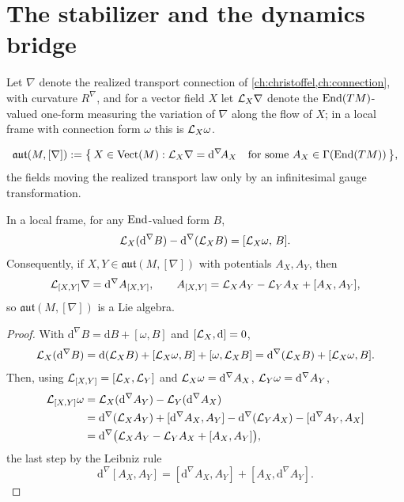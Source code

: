 \section{The stabilizer and the dynamics bridge}
\label{sec:dyn-bridge}
Let \(\nabla\) denote the realized transport connection of
\cref{ch:christoffel,ch:connection}, with curvature \(R^\nabla\), and
for a vector field \(X\) let \(\mathcal L_X\nabla\) denote the
\(\mathrm{End}(TM)\)-valued one-form measuring the variation of \(\nabla\)
along the flow of \(X\); in a local frame with connection form
\(\omega\) this is \(\mathcal L_X\omega\).

\begin{definition}
	\label{def:dyn-symmetry-algebra}
	\[
		\mathfrak{aut}(M,[\nabla])
		:=
		\bigl\{\,X\in\mathrm{Vect}(M)
		:
		\mathcal L_X\nabla=\mathrm d^{\nabla}\!A_X
		\quad\text{for some } A_X\in\Gamma(\mathrm{End}(TM))\,\bigr\},
	\]
	the fields moving the realized transport law only by an
	infinitesimal gauge transformation.
\end{definition}

\begin{lemma}
	\label{lem:dyn-gauge-cocycle}
	In a local frame, for any \(\mathrm{End}\)-valued form \(B\),
	\[
		\mathcal L_X(\mathrm d^\nabla B)-\mathrm d^\nabla(\mathcal L_XB)
		=
		[\mathcal L_X\omega,\,B] .
	\]
	Consequently, if \(X,Y\in\mathfrak{aut}(M,[\nabla])\) with
	potentials \(A_X,A_Y\), then
	\[
		\mathcal L_{[X,Y]}\nabla
		=
		\mathrm d^\nabla A_{[X,Y]},
		\qquad
		A_{[X,Y]}
		=
		\mathcal L_XA_Y-\mathcal L_YA_X+[A_X,A_Y],
	\]
	so \(\mathfrak{aut}(M,[\nabla])\) is a Lie algebra.
\end{lemma}
\begin{proof}
	With \(\mathrm d^\nabla B=\mathrm dB+[\omega,B]\) and
	\([\mathcal L_X,\mathrm d]=0\),
	\[
		\mathcal L_X(\mathrm d^\nabla B)
		=
		\mathrm d(\mathcal L_XB)+[\mathcal L_X\omega,B]+[\omega,\mathcal L_XB]
		=
		\mathrm d^\nabla(\mathcal L_XB)+[\mathcal L_X\omega,B].
	\]
	Then, using
	\(\mathcal L_{[X,Y]}=[\mathcal L_X,\mathcal L_Y]\) and
	\(\mathcal L_X\omega=\mathrm d^\nabla A_X\),
	\(\mathcal L_Y\omega=\mathrm d^\nabla A_Y\),
	\begin{align*}
		\mathcal L_{[X,Y]}\omega
		 & =
		\mathcal L_X(\mathrm d^\nabla A_Y)-\mathcal L_Y(\mathrm d^\nabla A_X)      \\
		 & =
		\mathrm d^\nabla(\mathcal L_XA_Y)+[\mathrm d^\nabla A_X,A_Y]
		-\mathrm d^\nabla(\mathcal L_YA_X)-[\mathrm d^\nabla A_Y,A_X]        \\
		 & =
		\mathrm d^\nabla\bigl(\mathcal L_XA_Y-\mathcal L_YA_X+[A_X,A_Y]\bigr),
	\end{align*}
	the last step by the Leibniz rule
	\[
		\mathrm d^\nabla[A_X,A_Y]
		=
		[\mathrm d^\nabla A_X,A_Y]+[A_X,\mathrm d^\nabla A_Y].
	\]
\end{proof}

